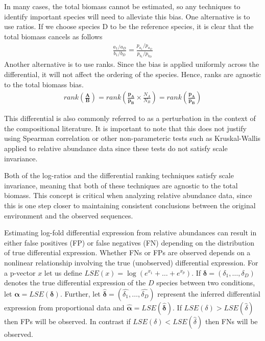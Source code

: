 In many cases, the total biomass cannot be estimated, so any techniques to identify important species will need to alleviate this bias. One alternative is to use ratios. If we choose species D to be the reference species, it is clear that the total biomass cancels as follows
  \begin{align}
    \frac{a_1/a_D}{b_1/b_D}  =  \frac{p_{a_1}/p_{a_D} }{p_{b_1}/p_{b_D}}
  \end{align}
  Another alternative is to use ranks. Since the bias is applied uniformly across the differential, it will not affect the ordering of the species. Hence, ranks are agnostic to the total biomass bias.
  \begin{align}
    rank (\frac{\bm{A}}{\bm{B}}) =
    rank(\frac{\bm{p_A}}{\bm{p_B}} \times \frac{N_A}{N_B}) =
    rank(\frac{\bm{p_A}}{\bm{p_B}} )
  \end{align}

This differential is also commonly referred to as a perturbation in the context of the compositional literature\cite{Pawlowsky-Glahn2015-qb}.
It is important to note that this does not justify using Spearman correlation or other non-parameteric tests such as Kruskal-Wallis applied to relative abundance data since these tests do not satisfy scale invariance\cite{Friedman2012-cn,Lovell_David_Muller_Warren_Taylor_Jennifer_Zwart_Alec_Helliwell2010-na}.

Both of the log-ratios and the differential ranking techniques satisfy scale invariance, meaning that both of these techniques are agnostic to the total biomass.  This concept is critical when analyzing relative abundance data, since this is one step closer to maintaining consistent conclusions between the original environment and the observed sequences.

Estimating log-fold differential expression from relative abundances can result in either false positives (FP) or false negatives (FN) depending on the distribution of true differential expression. Whether FNs or FPs are observed depends on a nonlinear relationship involving the true (unobserved) differential expression. For a p-vector $x$ let us define $LSE(x) = \log(e^{x_1}+ \ldots +e^{x_p})$. If $\bm{\delta}=(\delta_1, \ldots ,\delta_D)$ denotes the true differential expression of the $D$ species between two conditions, let $\bm{\alpha}=LSE(\bm{\delta})$. Further, let $\hat{\bm{\delta}}=(\hat{\delta_1}, \ldots, \hat{\delta_D})$ represent the inferred differential expression from proportional data and $\bm{\hat{\alpha}}=LSE(\bm{\hat{\delta}})$. If $LSE(\delta) > LSE(\hat{\delta})$ then FPs will be observed. In contrast if $LSE(\delta) < LSE(\hat{\delta})$ then FNs will be observed.

